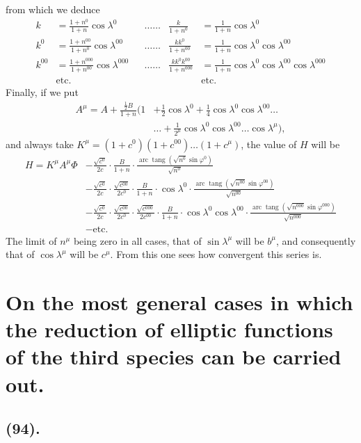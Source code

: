 \documentclass{article}
\begin{document}
from which we deduce
\[ \begin{aligned} k&=\frac{1+n^{0}}{1+n}\cos\lambda^{0} &&\ldots\ldots & \frac{k}{1+n^{0}}&=\frac{1}{1+n}\cos\lambda^{0}\\ k^{0}&=\frac{1+n^{00}}{1+n^{0}}\cos\lambda^{00} &&\ldots\ldots & \frac{kk^{0}}{1+n^{00}}&=\frac{1}{1+n}\cos\lambda^{0}\cos\lambda^{00}\\ k^{00}&=\frac{1+n^{000}}{1+n^{00}}\cos\lambda^{000} &&\ldots\ldots & \frac{kk^{0}k^{00}}{1+n^{000}}&=\frac{1}{1+n}\cos\lambda^{0}\cos\lambda^{00}\cos\lambda^{000}\\ &\text{etc.} &&& &\text{etc.} \end{aligned} \]
Finally, if we put
\[ \begin{aligned} A^{\mu}=A+\frac{\tfrac{1}{2}B}{1+n}(1&+\tfrac{1}{2}\cos\lambda^{0}+\tfrac{1}{4}\cos\lambda^{0}\cos\lambda^{00}\ldots\\ &\ldots+\frac{1}{2^{\mu}}\cos\lambda^{0}\cos\lambda^{00}\ldots\cos\lambda^{\mu}), \end{aligned} \]
and always take $K^{\mu}=(1+c^{0})(1+c^{00})\ldots(1+c^{\mu})$, the value of $H$ will be
\[ \begin{aligned} H=K^{\mu}A^{\mu}\Phi&-\frac{\sqrt{c^{0}}}{2c}\cdot\frac{B}{1+n}\cdot\frac{\operatorname{arc}\operatorname{tang}(\sqrt{n^{0}}\sin\varphi^{0})}{\sqrt{n^{0}}}\\ &-\frac{\sqrt{c^{0}}}{2c}\cdot\frac{\sqrt{c^{00}}}{2c^{0}}\cdot\frac{B}{1+n}\cdot\cos\lambda^{0}\cdot\frac{\operatorname{arc}\operatorname{tang}(\sqrt{n^{00}}\sin\varphi^{00})}{\sqrt{n^{00}}}\\ &-\frac{\sqrt{c^{0}}}{2c}\cdot\frac{\sqrt{c^{00}}}{2c^{0}}\cdot\frac{\sqrt{c^{000}}}{2c^{00}}\cdot\frac{B}{1+n}\cdot\cos\lambda^{0}\cos\lambda^{00}\cdot\frac{\operatorname{arc}\operatorname{tang}(\sqrt{n^{000}}\sin\varphi^{000})}{\sqrt{n^{000}}}\\ &-\text{etc.} \end{aligned} \]
The limit of $n^{\mu}$ being zero in all cases, that of $\sin\lambda^{\mu}$ will be $b^{\mu}$, and consequently that of $\cos\lambda^{\mu}$ will be $c^{\mu}$. From this one sees how convergent this series is.

\section*{On the most general cases in which the reduction of elliptic functions of the third species can be carried out.}

\subsection*{(94).}
\end{document}
